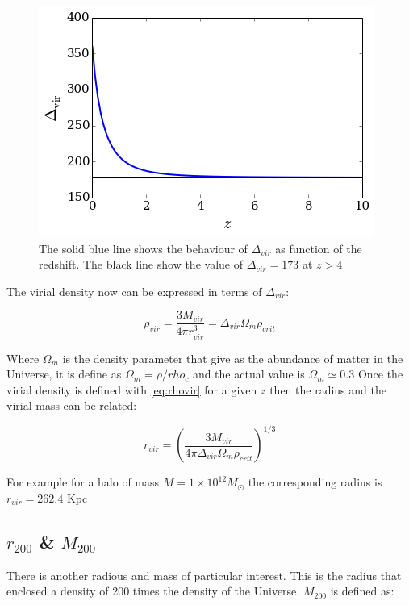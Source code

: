 \begin{figure}[H]\label{fig:dvir}
\centering
\includegraphics[scale=0.5]{../figures/deltavir.png}
\caption{The solid blue line shows the behaviour of $\Delta_{vir}$
as function of the redshift. The black line show the value of
$\Delta_{vir}=173$ at $z>4$}
\end{figure}

The virial density now can be expressed in terms of $\Delta_{vir}$:

\begin{equation}\label{eq:rhovir}
\rho_{vir} = \frac{3M_{vir}}{4 \pi r_{vir}^3} = \Delta_{vir} \Omega_m \rho_{crit} 
\end{equation}

Where $\Omega_m$ is the density parameter that give as the abundance of matter in the
Universe, it is define as $\Omega_m = \rho / rho_c$ and the actual value is $\Omega_m \simeq 0.3$
Once the virial density is defined with \ref{eq:rhovir} for a given $z$ then the radius
and the virial mass can be related:

\begin{equation}
r_{vir} = \left( \frac{3M_{vir}}{4 \pi \Delta_{vir} \Omega_m \rho_{crit} } \right )^{1/3}
\end{equation}

For example for a halo of mass $M = 1 \times 10^{12}M_{\odot}$ the corresponding radius
is $r_{vir}=262.4$ Kpc
\subsection{$r_{200}$ \& $M_{200}$}

There is another radious and mass of particular interest. This is the radius that enclosed a density
of 200 times the density of the Universe. $M_{200}$ is defined as:

